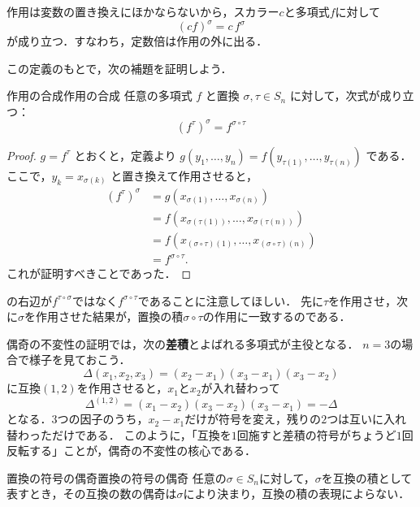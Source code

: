 作用は変数の置き換えにほかならないから，スカラー$c$と多項式$f$に対して
\[
  (cf)^\sigma = c\,f^\sigma
\]
が成り立つ．すなわち，定数倍は作用の外に出る．

この定義のもとで，次の補題を証明しよう．
\begin{lemma}{作用の合成}{作用の合成}
  任意の多項式 $f$ と置換 $\sigma, \tau \in S_n$ に対して，次式が成り立つ：
  \[
  (f^\tau)^\sigma = f^{\sigma \circ \tau}
  \]
\end{lemma}

\begin{tleftbar}
\begin{proof}
  $g = f^\tau$ とおくと，定義より $g(y_1, \dots, y_n) = f(y_{\tau(1)}, \dots, y_{\tau(n)})$ である．
  ここで，$y_k = x_{\sigma(k)}$ と置き換えて作用させると，
  \begin{align*}
    (f^\tau)^\sigma &= g(x_{\sigma(1)}, \dots, x_{\sigma(n)}) \\
    &= f(x_{\sigma(\tau(1))}, \dots, x_{\sigma(\tau(n))}) \\
    &= f(x_{(\sigma \circ \tau)(1)}, \dots, x_{(\sigma \circ \tau)(n)}) \\
    &= f^{\sigma \circ \tau}.
  \end{align*}
  これが証明すべきことであった．
\end{proof}
\end{tleftbar}

の右辺が$f^{\tau \circ \sigma}$ではなく$f^{\sigma \circ \tau}$であることに注意してほしい．
先に$\tau$を作用させ，次に$\sigma$を作用させた結果が，置換の積$\sigma \circ \tau$の作用に一致するのである．

偶奇の不変性の証明では，次の\textbf{差積}とよばれる多項式が主役となる．
$n = 3$の場合で様子を見ておこう．
\[
  \Delta(x_1, x_2, x_3) = (x_2 - x_1)(x_3 - x_1)(x_3 - x_2)
\]
に互換$(1, 2)$を作用させると，$x_1$と$x_2$が入れ替わって
\[
  \Delta^{(1,2)} = (x_1 - x_2)(x_3 - x_2)(x_3 - x_1) = -\Delta
\]
となる．$3$つの因子のうち，$x_2 - x_1$だけが符号を変え，残りの$2$つは互いに入れ替わっただけである．
このように，「互換を$1$回施すと差積の符号がちょうど$1$回反転する」ことが，偶奇の不変性の核心である．

\begin{prop}{置換の符号の偶奇}{置換の符号の偶奇}
  任意の$\sigma \in S_n$に対して，$\sigma$を互換の積として表すとき，その互換の数の偶奇は$\sigma$により決まり，互換の積の表現によらない．
\end{prop}

